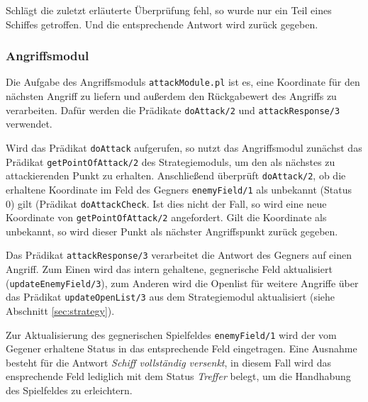 	Schlägt die zuletzt erläuterte Überprüfung fehl, so wurde nur ein Teil eines Schiffes getroffen. Und die entsprechende Antwort wird zurück 
	gegeben.
	
	
\subsubsection{Angriffsmodul} \label{sec:attackModule}
	Die Aufgabe des Angriffsmoduls \texttt{attackModule.pl} ist es, eine Koordinate für den nächsten Angriff zu liefern und außerdem den 
	Rückgabewert des Angriffs zu verarbeiten. 
	Dafür werden die Prädikate \texttt{doAttack/2} und \texttt{attackResponse/3} verwendet. 
	
	Wird das Prädikat \texttt{doAttack} aufgerufen, so nutzt das Angriffsmodul zunächst das Prädikat \texttt{getPointOfAttack/2} des
	Strategiemoduls, um den als nächstes zu attackierenden Punkt zu erhalten. Anschließend überprüft \texttt{doAttack/2},
	ob die erhaltene Koordinate im Feld des Gegners \texttt{enemyField/1} als unbekannt (Status 0) gilt (Prädikat \texttt{doAttackCheck}. 
	Ist dies nicht der Fall, so wird eine neue Koordinate von \texttt{getPointOfAttack/2} angefordert. 
	Gilt die Koordinate als unbekannt, so wird dieser Punkt als nächster Angriffspunkt zurück gegeben.
	
	Das Prädikat \texttt{attackResponse/3} verarbeitet die Antwort des Gegners auf einen Angriff. Zum Einen wird das intern gehaltene, 
	gegnerische Feld aktualisiert (\texttt{updateEnemyField/3}), zum Anderen wird die Openlist für weitere Angriffe über 
	das Prädikat \texttt{updateOpenList/3} aus dem Strategiemodul aktualisiert (siehe Abschnitt \ref{sec:strategy}).
	
	Zur Aktualisierung des gegnerischen Spielfeldes \texttt{enemyField/1} wird der vom Gegener erhaltene Status in das entsprechende 
	Feld eingetragen. Eine Ausnahme besteht für die Antwort \textit{Schiff vollständig versenkt}, in diesem Fall wird das ensprechende
	Feld lediglich mit dem Status \textit{Treffer} belegt, um die Handhabung des Spielfeldes zu erleichtern. 

	

	
